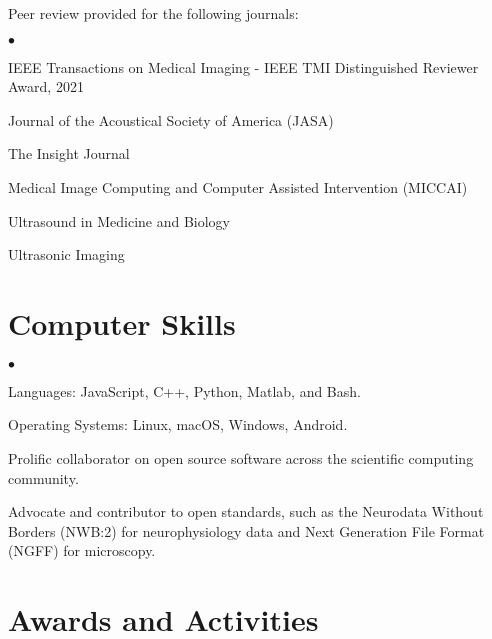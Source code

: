 \documentclass[margin,line]{res}
\newenvironment{list2}{
  \begin{list}{$\bullet$}{%
      \setlength{\itemsep}{0in}
      \setlength{\parsep}{0in} \setlength{\parskip}{0in}
      \setlength{\topsep}{0in} \setlength{\partopsep}{0in}
      \setlength{\leftmargin}{0.2in}}}{\end{list}}
\begin{document}
\begin{resume}
Peer review provided for the following journals:\newline

\begin{list2}
\item[] IEEE Transactions on Medical Imaging - IEEE TMI Distinguished Reviewer Award, 2021
\item[] Journal of the Acoustical Society of America (JASA)
\item[] The Insight Journal
\item[] Medical Image Computing and Computer Assisted Intervention (MICCAI)
\item[] Ultrasound in Medicine and Biology
\item[] Ultrasonic Imaging
\end{list2}

%
%
%
%

%
\section{\sc Computer Skills}
\begin{list2}
\item Languages: JavaScript, C++, Python, Matlab, and Bash.
\item Operating Systems: Linux, macOS, Windows, Android.
\item Prolific collaborator on open source software across the scientific computing community.
\item Advocate and contributor to open standards, such as the Neurodata
  Without Borders (NWB:2) for neurophysiology data and Next Generation File Format (NGFF) for microscopy.
\end{list2}

\section{\sc Awards and Activities}


\end{resume}
\end{document}
